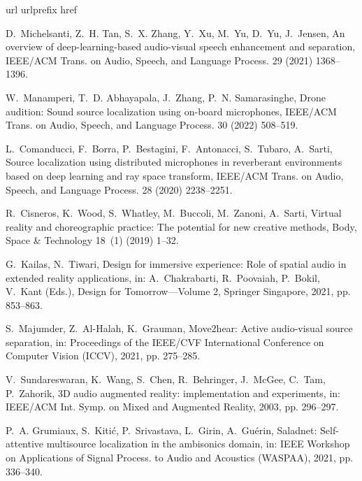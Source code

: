 \documentclass[3p, preprint, twocolumn]{elsarticle}
\begin{document}
\balance
\begin{thebibliography}{10}
\expandafter\ifx\csname url\endcsname\relax
  \def\url#1{\texttt{#1}}\fi
\expandafter\ifx\csname urlprefix\endcsname\relax\def\urlprefix{URL }\fi
\expandafter\ifx\csname href\endcsname\relax
  \def\href#1#2{#2} \def\path#1{#1}\fi

D.~Michelsanti, Z.~H. Tan, S.~X. Zhang, Y.~Xu, M.~Yu, D.~Yu, J.~Jensen, An
  overview of deep-learning-based audio-visual speech enhancement and
  separation, {IEEE/ACM} Trans. on Audio, Speech, and Language Process. 29
  (2021) 1368--1396.

W.~Manamperi, T.~D. Abhayapala, J.~Zhang, P.~N. Samarasinghe, Drone audition:
  Sound source localization using on-board microphones, {IEEE/ACM} Trans. on
  Audio, Speech, and Language Process. 30 (2022) 508--519.

L.~Comanducci, F.~Borra, P.~Bestagini, F.~Antonacci, S.~Tubaro, A.~Sarti,
  Source localization using distributed microphones in reverberant environments
  based on deep learning and ray space transform, {IEEE/ACM} Trans. on Audio,
  Speech, and Language Process. 28 (2020) 2238--2251.

R.~Cisneros, K.~Wood, S.~Whatley, M.~Buccoli, M.~Zanoni, A.~Sarti, Virtual
  reality and choreographic practice: The potential for new creative methods,
  Body, Space \& Technology 18~(1) (2019) 1--32.

G.~Kailas, N.~Tiwari, Design for immersive experience: Role of spatial audio in
  extended reality applications, in: A.~Chakrabarti, R.~Poovaiah, P.~Bokil,
  V.~Kant (Eds.), Design for Tomorrow---Volume 2, Springer Singapore, 2021, pp.
  853--863.

S.~Majumder, Z.~Al-Halah, K.~Grauman, Move2hear: Active audio-visual source
  separation, in: Proceedings of the IEEE/CVF International Conference on
  Computer Vision (ICCV), 2021, pp. 275--285.

V.~Sundareswaran, K.~Wang, S.~Chen, R.~Behringer, J.~McGee, C.~Tam, P.~Zahorik,
  3{D} audio augmented reality: implementation and experiments, in: {IEEE/ACM}
  Int. Symp. on Mixed and Augmented Reality, 2003, pp. 296--297.

P.~A. Grumiaux, S.~Kitić, P.~Srivastava, L.~Girin, A.~Guérin, Saladnet:
  Self-attentive multisource localization in the ambisonics domain, in: IEEE
  Workshop on Applications of Signal Process. to Audio and Acoustics (WASPAA),
  2021, pp. 336--340.


\end{thebibliography}
\end{document}
